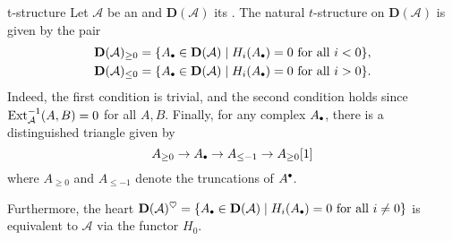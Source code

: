 \begin{example}{t-structure}
    Let $\mathcal{A}$ be an  and $\textbf{D}(\mathcal{A})$ its . The natural $t$-structure on $\textbf{D}(\mathcal{A})$ is given by the pair
    \[ \begin{aligned}
        \textbf{D}(\mathcal{A})_{\ge 0} &= \{ A_\bdot \in \textbf{D}(\mathcal{A}) \mid H_i(A_\bdot) = 0 \textup{ for all } i < 0 \} , \\
        \textbf{D}(\mathcal{A})_{\le 0} &= \{ A_\bdot \in \textbf{D}(\mathcal{A}) \mid H_i(A_\bdot) = 0 \textup{ for all } i > 0 \} .
    \end{aligned} \]
    Indeed, the first condition is trivial, and the second condition holds since $\textup{Ext}_\mathcal{A}^{-1}(A, B) = 0$ for all $A, B$. Finally, for any complex $A_\bdot$, there is a distinguished triangle given by
    \[ A_{\ge 0} \to A_\bdot \to A_{\le -1} \to A_{\ge 0}[1] \]
    where $A_{\ge 0}$ and $A_{\le -1}$ denote the truncations of $A^\bdot$.
    
    Furthermore, the heart $\textbf{D}(\mathcal{A})^\heartsuit = \{ A_\bdot \in \textbf{D}(\mathcal{A}) \mid H_i(A_\bdot) = 0 \textup{ for all } i \ne 0 \}$ is equivalent to $\mathcal{A}$ via the functor $H_0$.
\end{example}
